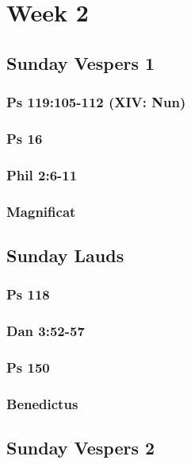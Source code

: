 \chapter{Week 2}


\section{Sunday Vespers 1}

\subsection{Ps 119:105-112 (XIV: Nun)}

\subsection{Ps 16}

\subsection{Phil 2:6-11}

\subsection{Magnificat}


\section{Sunday Lauds}

\subsection{Ps 118}

\subsection{Dan 3:52-57}

\subsection{Ps 150}

\subsection{Benedictus}


\section{Sunday Vespers 2}

